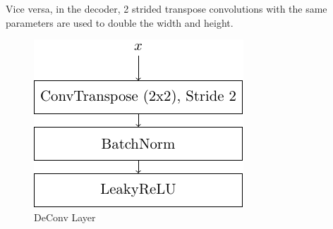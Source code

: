 Vice versa, in the decoder, 2 strided transpose convolutions with the same parameters are used to double the width and height.
\begin{figure}[h!]
    \centering
    \includegraphics[]{figures/model_architecture/build/deconv_layer.pdf}
    \caption{DeConv Layer}
\end{figure}

